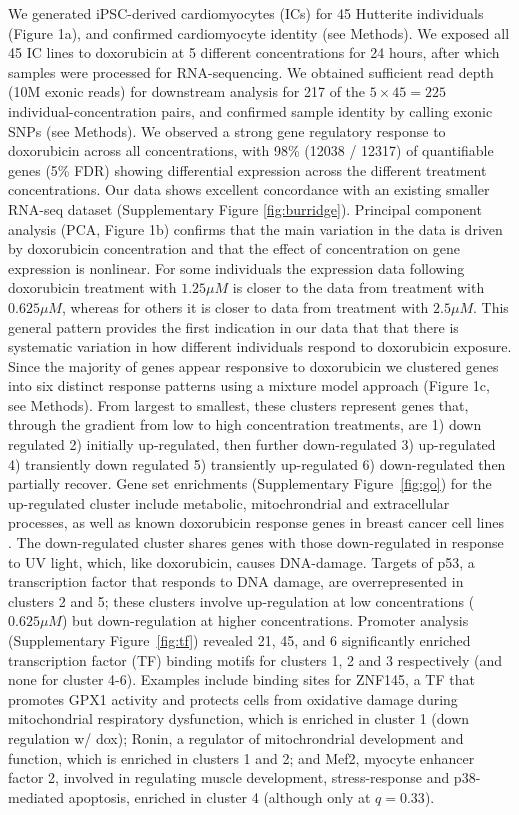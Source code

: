 \documentclass{article}
\begin{document}
We generated iPSC-derived cardiomyocytes (ICs) for 45 Hutterite individuals (Figure 1a), and confirmed cardiomyocyte identity (see Methods). We exposed all 45 IC lines to doxorubicin at 5 different concentrations for 24 hours, after which samples were processed for RNA-sequencing. We obtained sufficient read depth (10M exonic reads) for downstream analysis for 217 of the $5 \times 45 = 225$ individual-concentration pairs, and confirmed sample identity by calling exonic SNPs (see Methods). We observed a strong gene regulatory response to doxorubicin across all concentrations, with 98\% (12038 / 12317) of quantifiable genes (5\% FDR) showing differential expression across the different treatment concentrations. Our data shows excellent concordance with an existing smaller RNA-seq dataset\cite{Burridge2016} (Supplementary Figure \ref{fig:burridge}). Principal component analysis (PCA, Figure 1b) confirms that the main variation in the data is driven by doxorubicin concentration and that the effect of concentration on gene expression is nonlinear. For some individuals the expression data following doxorubicin treatment with $1.25\mu M$ is closer to the data from treatment with $0.625 \mu M$, whereas for others it is closer to data from treatment with $2.5\mu M$. This general pattern provides the first indication in our data that that there is systematic variation in how different individuals respond to doxorubicin exposure. Since the majority of genes appear responsive to doxorubicin we clustered genes into six distinct response patterns using a mixture model approach (Figure 1c, see Methods). From largest to smallest, these clusters represent genes that, through the gradient from low to high concentration treatments, are  1) down regulated 2) initially up-regulated, then further down-regulated 3) up-regulated 4) transiently down regulated 5) transiently up-regulated 6) down-regulated then partially recover. Gene set enrichments (Supplementary Figure~\ref{fig:go}) for the up-regulated cluster include metabolic, mitochrondrial and extracellular processes, as well as known doxorubicin response genes in breast cancer cell lines \cite{graessmann2007chemotherapy}. The down-regulated cluster shares genes with those down-regulated in response to UV light, which, like doxorubicin, causes DNA-damage. Targets of p53, a transcription factor that responds to DNA damage, are overrepresented in clusters 2 and 5; these clusters involve up-regulation at low concentrations ($0.625\mu M$) but down-regulation at higher concentrations. Promoter analysis (Supplementary Figure~\ref{fig:tf}) revealed 21, 45, and 6 significantly enriched transcription factor (TF) binding motifs for clusters 1, 2 and 3 respectively (and none for cluster 4-6). Examples include binding sites for ZNF145, a TF that promotes GPX1 activity and protects cells from oxidative damage during mitochondrial respiratory dysfunction\cite{Lu2012}, which is enriched in cluster 1 (down regulation w/ dox); Ronin, a regulator of mitochrondrial development and function\cite{Poche2016}, which is enriched in clusters 1 and 2; and Mef2, myocyte enhancer factor 2, involved in regulating muscle development, stress-response and p38-mediated apoptosis\cite{Zarubin2005}, enriched in cluster 4 (although only at $q=0.33$).
\end{document}
